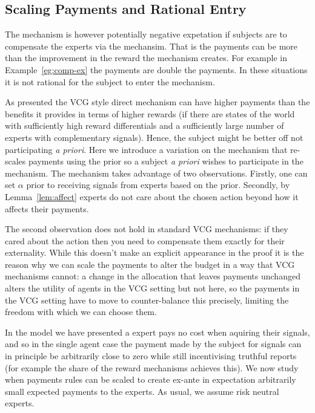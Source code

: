 \subsection{Scaling Payments and Rational Entry}

The mechanism is however potentially negative expetation if subjects are to compensate the experts via the mechansim.  That is the payments can be more than the improvement in the reward the mechanism creates. For example in Example~\ref{eg:comp-ex} the payments are double the payments. In these situations it is not rational for the subject to enter the mechanism.


As presented the VCG style direct mechanism can have higher payments than the benefits it provides in terms of higher rewards (if there are states of the world with sufficiently high reward differentials and a sufficiently large number of experts with complementary signals). Hence, the subject might be better off not participating \emph{a priori}. Here we introduce a variation on the mechanism that re-scales payments using the prior so a subject \emph{a priori} wishes to participate in the mechanism. The mechanism takes advantage of two observations. Firstly, one can set $\alpha$ prior to receiving signals from experts based on the prior. Secondly, by Lemma~\ref{lem:affect} experts do not care about the chosen action beyond how it affects their payments. 

The second observation does not hold in standard VCG mechanisms: if they cared about the action then you need to compensate them exactly for their externality. While this doesn't make an explicit appearance in the proof it is the reason why we can scale the payments to alter the budget in a way that VCG mechanisms cannot: a change in the allocation that leaves payments unchanged alters the utility of agents in the VCG setting but not here, so the payments in the VCG setting have to move to counter-balance this precisely, limiting the freedom with which we can choose them.


In the model we have presented a expert pays no cost when aquiring their signals, and so in the single agent case the payment made by the subject for signals can in principle be arbitrarily close to zero while still incentivising truthful reports (for example the share of the reward mechanisms achieves this). We now study when payments rules can be scaled to create ex-ante in expectation arbitrarily small expected payments to the experts. As usual, we assume risk neutral experts. 


